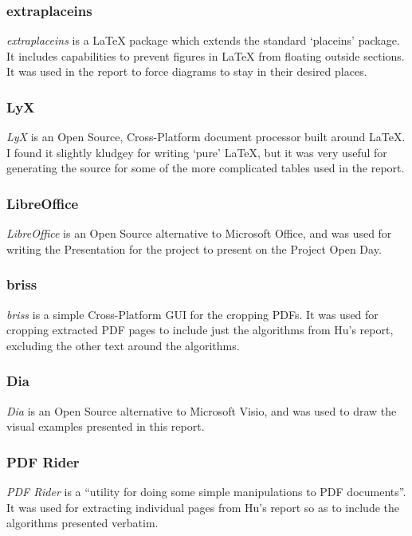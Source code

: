 \documentclass[a4paper,11pt]{report}
\begin{document}
\subsubsection*{extraplaceins}
\emph{extraplaceins} \citep{prog:extraplaceins} is a \LaTeX{} package which extends the standard `placeins' package. It includes capabilities to prevent figures in \LaTeX{} from floating outside sections. It was used in the report to force diagrams to stay in their desired places.

\subsubsection*{LyX}
\emph{LyX} \citep{prog:lyx} is an Open Source, Cross-Platform document processor built around \LaTeX{}. I found it slightly kludgey for writing `pure' \LaTeX{}, but it was very useful for generating the source for some of the more complicated tables used in the report. 

\subsubsection*{LibreOffice}
\emph{LibreOffice} \citep{prog:libreoffice} is an Open Source alternative to Microsoft Office, and was used for writing the Presentation for the project to present on the Project Open Day.

\subsubsection*{briss}
\emph{briss} \citep{prog:briss} is a simple Cross-Platform GUI for the cropping PDFs. It was used for cropping extracted PDF pages to include just the algorithms from Hu's report, excluding the other text around the algorithms.

\subsubsection*{Dia}
\emph{Dia} \citep{prog:dia} is an Open Source alternative to Microsoft Visio, and was used to draw the visual examples presented in this report.

\subsubsection*{PDF Rider}
\emph{PDF Rider} \citep{prog:pdfrider} is a ``utility for doing some simple manipulations to PDF documents''. It was used for extracting individual pages from Hu's report so as to include the algorithms presented verbatim.
\end{document}
